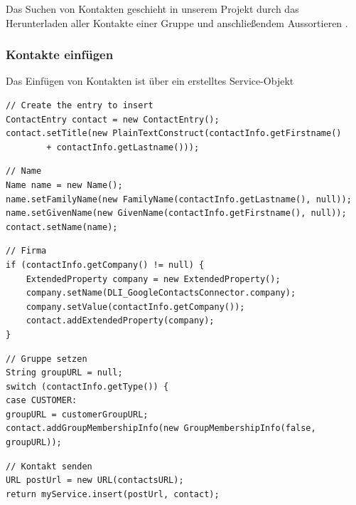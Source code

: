 Das Suchen von Kontakten geschieht in unserem Projekt durch das Herunterladen aller Kontakte
 einer Gruppe und anschließendem Aussortieren .

\FloatBarrier
\subsubsection{Kontakte einf\"ugen}
Das Einfügen von Kontakten ist über ein erstelltes Service-Objekt 

\begin{lstlisting}[float=h!t]
// Create the entry to insert
ContactEntry contact = new ContactEntry();
contact.setTitle(new PlainTextConstruct(contactInfo.getFirstname()
		+ contactInfo.getLastname()));
\end{lstlisting}

\begin{lstlisting}[float=h!t]
// Name
Name name = new Name();
name.setFamilyName(new FamilyName(contactInfo.getLastname(), null));
name.setGivenName(new GivenName(contactInfo.getFirstname(), null));
contact.setName(name);
\end{lstlisting}

\begin{lstlisting}[float=h!t]
// Firma
if (contactInfo.getCompany() != null) {
	ExtendedProperty company = new ExtendedProperty();
	company.setName(DLI_GoogleContactsConnector.company);
	company.setValue(contactInfo.getCompany());
	contact.addExtendedProperty(company);
}
\end{lstlisting}

\begin{lstlisting}[float=h!t]
// Gruppe setzen
String groupURL = null;
switch (contactInfo.getType()) {
case CUSTOMER:
groupURL = customerGroupURL;
contact.addGroupMembershipInfo(new GroupMembershipInfo(false, groupURL));
\end{lstlisting}

\begin{lstlisting}[float=h!t]
// Kontakt senden		
URL postUrl = new URL(contactsURL);
return myService.insert(postUrl, contact);
\end{lstlisting}
\FloatBarrier